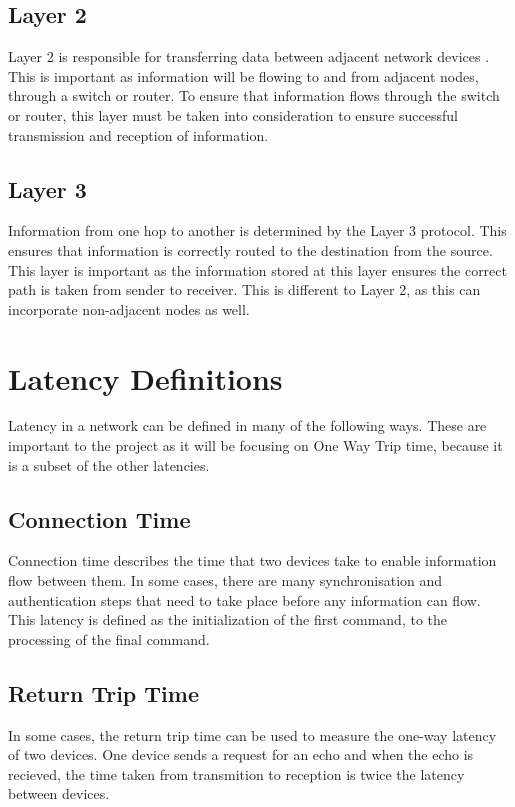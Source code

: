 \subsection{Layer 2}

Layer 2 is responsible for transferring data between adjacent network devices \cite{IEEE802}. This is important as
information will be flowing to and from adjacent nodes, through a switch or router. To ensure that
information flows through the switch or router, this layer must be taken into consideration to ensure
successful transmission and reception of information.

\subsection{Layer 3}

Information from one hop to another is determined by the Layer 3 protocol. This ensures that
information is correctly routed to the destination from the source. This layer is important as the
information stored at this layer ensures the correct path is taken from sender to receiver. This is
different to Layer 2, as this can incorporate non-adjacent nodes as well.

\section{Latency Definitions}

Latency in a network can be defined in many of the following ways. These are important to the project as it will be focusing on One Way Trip time, because it is a subset of the other latencies.

\subsection{Connection Time}

Connection time describes the time that two devices take to enable information flow between them. In
some cases, there are many synchronisation and authentication steps that need to take place before
any information can flow. This latency is defined as the initialization of the first command, to the
processing of the final command.

\subsection{Return Trip Time}

In some cases, the return trip time can be used to measure the one-way latency of two devices. One
device sends a request for an echo and when the echo is recieved, the time taken from transmition to reception is
twice the latency between devices.

